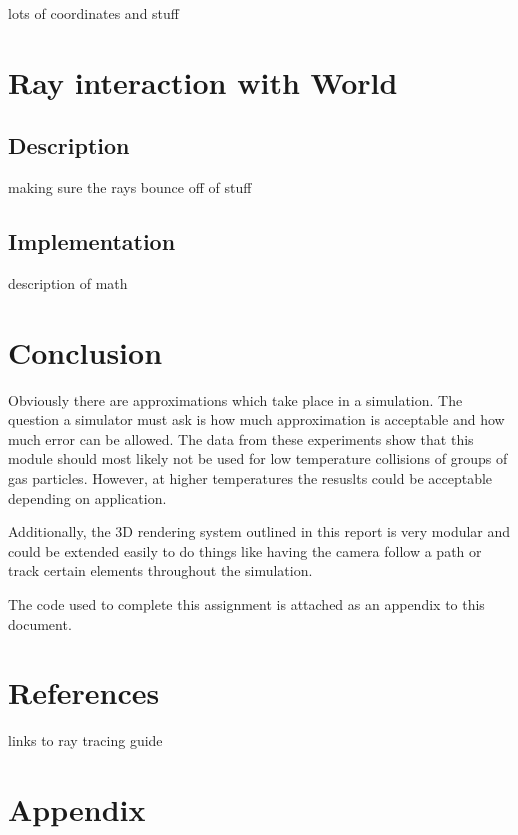 \documentclass{article}
\begin{document}
lots of coordinates and stuff

\section{Ray interaction with World}
\subsection{Description}
making sure the rays bounce off of stuff

\subsection{Implementation}

description of math

\section{Conclusion}
Obviously there are approximations which take place in a simulation. The question a simulator must ask is how
much approximation is acceptable and how much error can be allowed. The data from these experiments show that this
module should most likely not be used for low temperature collisions of groups of gas particles. However, at higher
temperatures the resuslts could be acceptable depending on application.

Additionally, the 3D rendering system outlined in this report is very modular and could be extended easily to 
do things like having the camera follow a path or track certain elements throughout the simulation.

The code used to complete this assignment is attached as an appendix to this document.

\section{References}
links to ray tracing guide


\newpage
\onecolumn
\section{Appendix}



\end{document}
